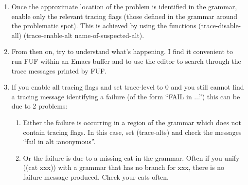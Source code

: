 \documentclass[10pt,a4paper]{report}
\begin{document}
\begin{enumerate}
\item Once the approximate location of the problem is identified in the grammar,
enable only the relevant tracing flags (those defined in the grammar around
the problematic spot).  This is achieved by using the functions
(trace-disable-all) (trace-enable-alt name-of-suspected-alt). 

\item From then on, try to understand what's happening.  I find it convenient to
run FUF within an Emacs buffer and to use the editor to search through the
trace messages printed by FUF.

\item If you enable all tracing flags and set trace-level to 0 and you still
cannot find a tracing message identifying a failure (of the form ``FAIL in
...'') this can be due to 2 problems:
	\begin{enumerate}
	\item Either the failure is occurring in a region of the grammar which
	does not contain tracing flags.  In this case, set (trace-alts) and
	check the messages ``fail in alt :anonymous''.  

	\item Or the failure is due to a missing cat in the grammar.  Often if
	you unify ((cat xxx)) with a grammar that has no branch for xxx, 
	there is no failure message produced.  Check your cats often.
	\end{enumerate}
\end{enumerate}
\end{document}
